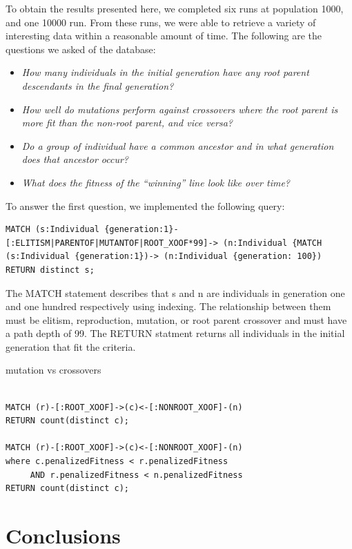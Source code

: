 \documentclass[12pt]{article}
\begin{document}
To obtain the results presented here, we completed six runs at population 1000, and one 10000 run. From these runs, we were able to retrieve a variety of interesting data within a reasonable amount of time. The following are the questions we asked of the database:
\begin{itemize}
\item \textit{How many individuals in the initial generation have any root parent descendants in the final generation?}
\item \textit{How well do mutations perform against crossovers where the root parent is more fit than the non-root parent, and vice versa?}
\item \textit{Do a group of individual have a common ancestor and in what generation does that ancestor occur?}
\item \textit{What does the fitness of the ``winning'' line look like over time?}

\end{itemize}

To answer the first question, we implemented the following query:

\begin{verbatim}
MATCH (s:Individual {generation:1}-[:ELITISM|PARENTOF|MUTANTOF|ROOT_XOOF*99]-> (n:Individual {MATCH (s:Individual {generation:1})-> (n:Individual {generation: 100})
RETURN distinct s;
\end{verbatim}

The MATCH statement describes that s and n are individuals in generation one and one hundred respectively using indexing. The relationship between them must be elitism, reproduction, mutation, or root parent crossover and must have a path depth of 99.
The RETURN statment returns all individuals in the initial generation that fit the criteria.    

mutation vs crossovers

\begin{verbatim}

MATCH (r)-[:ROOT_XOOF]->(c)<-[:NONROOT_XOOF]-(n)
RETURN count(distinct c);

MATCH (r)-[:ROOT_XOOF]->(c)<-[:NONROOT_XOOF]-(n)
where c.penalizedFitness < r.penalizedFitness 
     AND r.penalizedFitness < n.penalizedFitness
RETURN count(distinct c);

\end{verbatim}

\section{Conclusions} \label{sec:conclusion}
\end{document}
